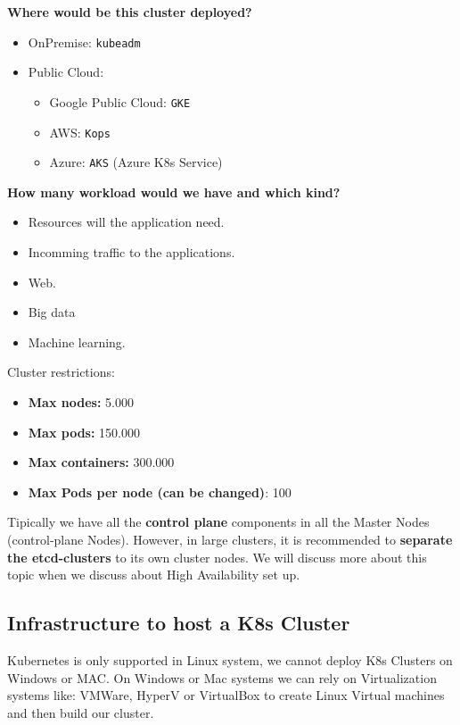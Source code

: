 \documentclass{article}
\newenvironment{blocktemplateI}[1]{%
    \tcolorbox[beamer,%
    noparskip,breakable,
    colframe=Violet,%
    colbacklower=Black,%
    title=#1]}%
    {\endtcolorbox}
\newenvironment{blocktemplateII}[1]{%
    \tcolorbox[beamer,%
    noparskip,breakable,
    colframe=Green,%
    colbacklower=LimeGreen!75!LightGreen,%
    title=#1]}%
    {\endtcolorbox}
\begin{document}
\textbf{Where would be this cluster deployed?}
\begin{itemize}
    \item OnPremise: \verb|kubeadm|
    \item Public Cloud:
    \begin{itemize}
        \item Google Public Cloud: \verb|GKE|
        \item AWS: \verb|Kops|
        \item Azure: \verb|AKS| (Azure K8s Service)
    \end{itemize}
\end{itemize}

\textbf{How many workload would we have and which kind?}
\begin{itemize}
    \item Resources will the application need.
    \item Incomming traffic to the applications.
    \item Web.
    \item Big data
    \item Machine learning.
\end{itemize}

\begin{blocktemplateII}{NOTE}
Cluster restrictions:
\begin{itemize}
    \item \textbf{Max nodes:} 5.000
    \item \textbf{Max pods:} 150.000
    \item \textbf{Max containers:} 300.000
    \item \textbf{Max Pods per node (can be changed)}: 100
\end{itemize}
\end{blocktemplateII}

\begin{blocktemplateI}{NOTE}
Tipically we have all the \textbf{control plane} components in all the Master Nodes (control-plane Nodes).
However, in large clusters, it is recommended to \textbf{separate the etcd-clusters}
to its own cluster nodes. We will discuss more about this topic when we discuss about High Availability set up.
\end{blocktemplateI}

\subsection{Infrastructure to host a K8s Cluster}
Kubernetes is only supported in Linux system, we cannot deploy K8s Clusters on Windows or MAC.
On Windows or Mac systems we can rely on Virtualization systems like: VMWare, HyperV or VirtualBox to create Linux Virtual machines and then build our cluster.
\end{document}
